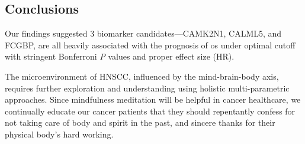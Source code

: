 \documentclass[jpm,article,submit,moreauthors,pdftex]{Definitions/mdpi}
\begin{document}
\begin{paracol}{2}

\section{Conclusions} %
Our findings suggested 3 biomarker candidates---CAMK2N1, CALML5, and FCGBP, are all heavily associated with the prognosis of \acrshort{os} under optimal cutoff with stringent Bonferroni \textit{P} values and proper effect size (HR). 

The microenvironment of HNSCC, influenced by the mind-brain-body axis, requires further exploration and understanding using holistic multi-parametric approaches.
Since mindfulness meditation will be helpful in cancer healthcare, we continually educate our cancer patients that they should repentantly confess for not taking care of body and spirit in the past, and sincere thanks for their physical body's hard working.





\end{paracol}
\end{document}
